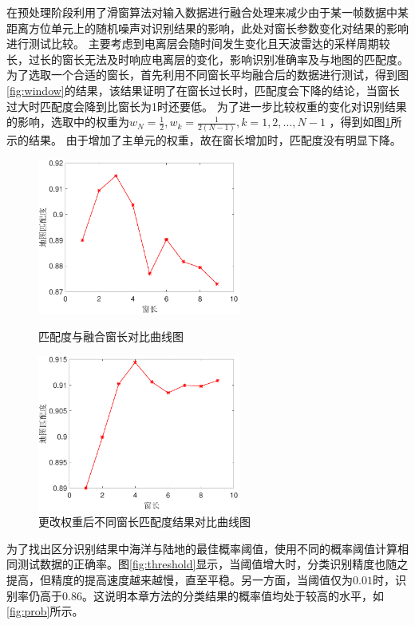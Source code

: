 在预处理阶段利用了滑窗算法对输入数据进行融合处理来减少由于某一帧数据中某距离方位单元上的随机噪声对识别结果的影响，此处对窗长参数变化对结果的影响进行测试比较。
主要考虑到电离层会随时间发生变化且天波雷达的采样周期较长，过长的窗长无法及时响应电离层的变化，影响识别准确率及与地图的匹配度。
为了选取一个合适的窗长，首先利用不同窗长平均融合后的数据进行测试，得到图\ref{fig:window}的结果，该结果证明了在窗长过长时，匹配度会下降的结论，当窗长过大时匹配度会降到比窗长为1时还要低。
为了进一步比较权重的变化对识别结果的影响，选取中的权重为$w_N=\frac{1}{2},w_k=\frac{1}{2(N-1)},k=1,2,\dots,N-1$
，得到如图\ref{fig:weighted_window}所示的结果。
由于增加了主单元的权重，故在窗长增加时，匹配度没有明显下降。

\begin{figure}[hbt]
	\centering
	\begin{minipage}{7cm}
		\centering
		\includegraphics[width=6.67cm]{figures/othr/window}
		\caption{匹配度与融合窗长对比曲线图}
		\label{fig:window}
	\end{minipage}
	\hspace{10pt}
	\begin{minipage}{7cm}
		\centering
		\includegraphics[width=6.67cm]{figures/othr/weighted_window}
		\caption{更改权重后不同窗长匹配度结果对比曲线图}
		\label{fig:weighted_window}
	\end{minipage}

\end{figure}


为了找出区分识别结果中海洋与陆地的最佳概率阈值，使用不同的概率阈值计算相同测试数据的正确率。图\ref{fig:threshold}显示，当阈值增大时，分类识别精度也随之提高，但精度的提高速度越来越慢，直至平稳。另一方面，当阈值仅为$0.01$时，识别率仍高于$0.86$。这说明本章方法的分类结果的概率值均处于较高的水平，如\ref{fig:prob}所示。

